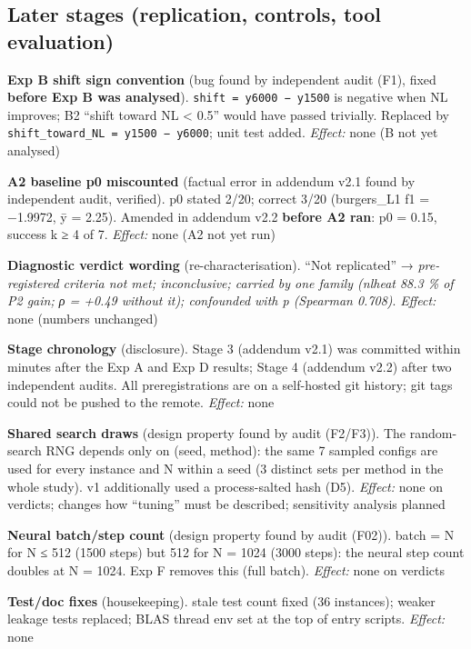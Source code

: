 \subsection*{Later stages (replication, controls, tool evaluation)}
\begin{description}\setlength{\itemsep}{2pt}
\item[V1] \textbf{Exp B shift sign convention} (bug found by independent audit (F1), fixed \textbf{before Exp B was analysed}). \texttt{shift\ =\ y6000\ −\ y1500} is negative when NL improves; B2 ``shift toward NL \textless{} 0.5'' would have passed trivially. Replaced by \texttt{shift\_\allowbreak{}toward\_\allowbreak{}NL\ =\ y1500\ −\ y6000}; unit test added. \emph{Effect:} none (B not yet analysed)
\item[V2] \textbf{A2 baseline p0 miscounted} (factual error in addendum v2.1 found by independent audit, verified). p0 stated 2/20; correct 3/20 (burgers\_L1 f1 = −1.9972, ȳ = 2.25). Amended in addendum v2.2 \textbf{before A2 ran}: p0 = 0.15, success k ≥ 4 of 7. \emph{Effect:} none (A2 not yet run)
\item[V3] \textbf{Diagnostic verdict wording} (re-characterisation). ``Not replicated'' → \emph{pre-registered criteria not met; inconclusive; carried by one family (nlheat 88.3 \% of P2 gain; ρ = +0.49 without it); confounded with p (Spearman 0.708)}. \emph{Effect:} none (numbers unchanged)
\item[V4] \textbf{Stage chronology} (disclosure). Stage 3 (addendum v2.1) was committed within minutes after the Exp A and Exp D results; Stage 4 (addendum v2.2) after two independent audits. All preregistrations are on a self-hosted git history; git tags could not be pushed to the remote. \emph{Effect:} none
\item[V5] \textbf{Shared search draws} (design property found by audit (F2/F3)). The random-search RNG depends only on (seed, method): the same 7 sampled configs are used for every instance and N within a seed (3 distinct sets per method in the whole study). v1 additionally used a process-salted hash (D5). \emph{Effect:} none on verdicts; changes how ``tuning'' must be described; sensitivity analysis planned
\item[V6] \textbf{Neural batch/step count} (design property found by audit (F02)). batch = N for N ≤ 512 (1500 steps) but 512 for N = 1024 (3000 steps): the neural step count doubles at N = 1024. Exp F removes this (full batch). \emph{Effect:} none on verdicts
\item[V7] \textbf{Test/doc fixes} (housekeeping). stale test count fixed (36 instances); weaker leakage tests replaced; BLAS thread env set at the top of entry scripts. \emph{Effect:} none

\end{description}
